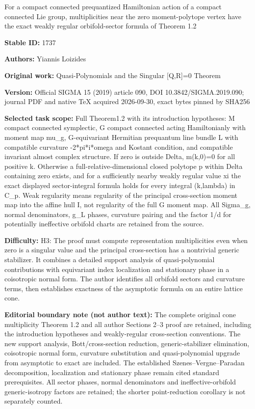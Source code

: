 \documentclass[11pt]{article}
\numberwithin{equation}{section}
\begin{document}
\begin{center}\Large For a compact connected prequantized Hamiltonian action of a compact connected Lie group, multiplicities near the zero moment-polytope vertex have the exact weakly regular orbifold-sector formula of Theorem 1.2\end{center}
\noindent\textbf{Stable ID:} 1737\par
\noindent\textbf{Authors:} Yiannis Loizides\par
\noindent\textbf{Original work:} Quasi-Polynomials and the Singular [Q,R]=0 Theorem\par
\noindent\textbf{Version:} Official SIGMA 15 (2019) article 090, DOI 10.3842/SIGMA.2019.090; journal PDF and native TeX acquired 2026-09-30, exact bytes pinned by SHA256\par
\noindent\textbf{Selected task scope:} Full Theorem1.2 with its introduction hypotheses: M compact connected symplectic, G compact connected acting Hamiltonianly with moment map mu\_g, G-equivariant Hermitian prequantum line bundle L with compatible curvature -2*pi*i*omega and Kostant condition, and compatible invariant almost complex structure. If zero is outside Delta, m(k,0)=0 for all positive k. Otherwise a full-relative-dimensional closed polytope p within Delta containing zero exists, and for a sufficiently nearby weakly regular value xi the exact displayed sector-integral formula holds for every integral (k,lambda) in C\_p. Weak regularity means regularity of the principal cross-section moment map into the affine hull I, not regularity of the full G moment map. All Sigma\_g, normal denominators, g\_L phases, curvature pairing and the factor 1/d for potentially ineffective orbifold charts are retained from the source.\par
\noindent\textbf{Difficulty:} H3: The proof must compute representation multiplicities even when zero is a singular value and the principal cross-section has a nontrivial generic stabilizer. It combines a detailed support analysis of quasi-polynomial contributions with equivariant index localization and stationary phase in a coisotropic normal form. The author identifies all orbifold sectors and curvature terms, then establishes exactness of the asymptotic formula on an entire lattice cone.\par
\noindent\textbf{Editorial boundary note (not author text):} The complete original cone multiplicity Theorem 1.2 and all author Sections 2–3 proof are retained, including the introduction hypotheses and weakly-regular cross-section conventions. The new support analysis, Bott/cross-section reduction, generic-stabilizer elimination, coisotropic normal form, curvature substitution and quasi-polynomial upgrade from asymptotic to exact are included. The established Szenes–Vergne–Paradan decomposition, localization and stationary phase remain cited standard prerequisites. All sector phases, normal denominators and ineffective-orbifold generic-isotropy factors are retained; the shorter point-reduction corollary is not separately counted.\par
\end{document}
